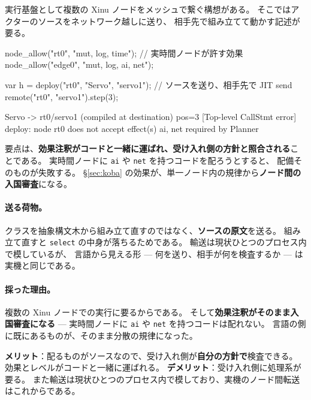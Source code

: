 \documentclass[11pt,a4paper]{ltjsarticle}
\theoremstyle{definition}
\theoremstyle{remark}
\begin{document}
実行基盤として複数の Xinu ノードをメッシュで繋ぐ構想がある。
そこではアクターのソースをネットワーク越しに送り、
相手先で組み立てて動かす記述が要る。

\begin{aipl}
node_allow("rt0",   "mut, log, time");        // 実時間ノードが許す効果
node_allow("edge0", "mut, log, ai, net");

var h = deploy("rt0", "Servo", "servo1");     // ソースを送り、相手先で JIT
send remote("rt0", "servo1").step(3);
\end{aipl}
\begin{term}
[deploy] Servo -> rt0/servo1 (compiled at destination)
pos=3
[Top-level CallStmt error] deploy: node rt0 does not accept effect(s) {ai, net}
                           required by Planner
\end{term}

要点は、\textbf{効果注釈がコードと一緒に運ばれ、受け入れ側の方針と照合される}ことである。
実時間ノードに \texttt{ai} や \texttt{net} を持つコードを配ろうとすると、
配備そのものが失敗する。
\S\ref{sec:koba} の効果が、単一ノード内の規律から\textbf{ノード間の入国審査}になる。

\paragraph{送る荷物。}
クラスを抽象構文木から組み立て直すのではなく、\textbf{ソースの原文}を送る。
組み立て直すと \texttt{select} の中身が落ちるためである。
輸送は現状ひとつのプロセス内で模しているが、
言語から見える形 --- 何を送り、相手が何を検査するか --- は実機と同じである。


\paragraph{採った理由。}
複数の Xinu ノードでの実行に要るからである。
そして\textbf{効果注釈がそのまま入国審査になる} ---
実時間ノードに \texttt{ai} や \texttt{net} を持つコードは配れない。
言語の側に既にあるものが、そのまま分散の規律になった。

\textbf{メリット}：配るものがソースなので、受け入れ側が\textbf{自分の方針で}検査できる。
効果とレベルがコードと一緒に運ばれる。
\textbf{デメリット}：受け入れ側に処理系が要る。
また輸送は現状ひとつのプロセス内で模しており、実機のノード間転送はこれからである。

\end{document}
